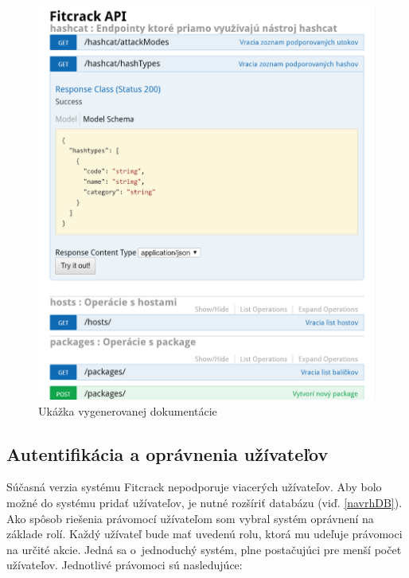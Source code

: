 \documentclass[zadani,slovak]{fitthesis}
\begin{document}
\begin{figure}[H]
    \centering
    \includegraphics[scale=0.45]{obrazky/doc.PNG}
    \caption{Ukážka vygenerovanej dokumentácie}
    \label{fig:doc}
\end{figure}

\subsection{Autentifikácia a oprávnenia užívateľov}
Súčasná verzia systému Fitcrack nepodporuje viacerých užívateľov. Aby bolo možné do systému pridať užívateľov, je nutné rozšíriť databázu (viď. \ref{navrhDB}). Ako spôsob riešenia právomocí užívateľom som vybral systém oprávnení na základe rolí. Každý užívateľ bude mať uvedenú rolu, ktorá mu udeľuje právomoci na určité akcie. Jedná sa o~jednoduchý systém, plne postačujúci pre menší počet užívateľov. Jednotlivé právomoci sú nasledujúce:
\end{document}
